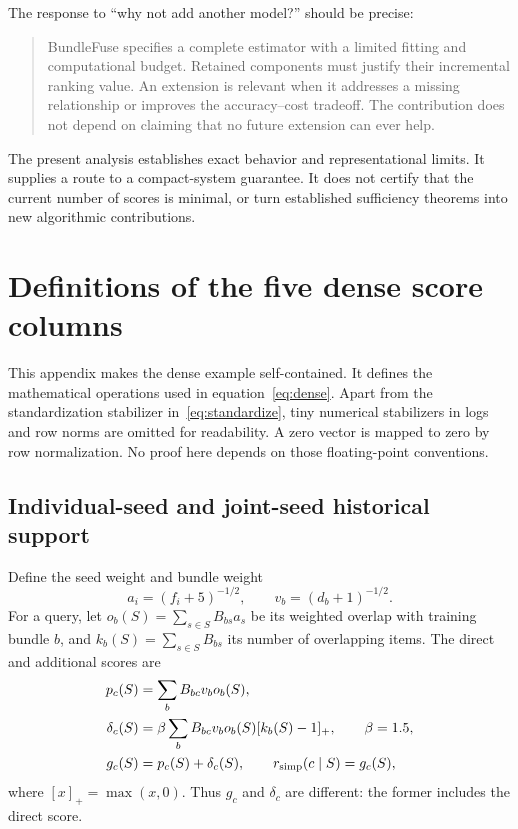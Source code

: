 \documentclass[11pt,a4paper]{article}
\begin{document}
The response to ``why not add another model?'' should be precise:
\begin{quote}
BundleFuse specifies a complete estimator with a limited fitting and
computational budget. Retained components must justify their incremental
ranking value. An extension is relevant when it addresses a missing
relationship or improves the accuracy--cost tradeoff. The contribution does
not depend on claiming that no future extension can ever help.
\end{quote}

The present analysis establishes exact behavior and representational limits.
It supplies a route to a compact-system guarantee. It does not certify that
the current number of scores is minimal, or turn established sufficiency
theorems into new algorithmic contributions.

\appendix
\section{Definitions of the five dense score columns}
\label{app:scores}

This appendix makes the dense example self-contained. It defines the
mathematical operations used in equation~\eqref{eq:dense}. Apart from the
standardization stabilizer in~\eqref{eq:standardize}, tiny numerical
stabilizers in logs and row norms are omitted for readability. A zero vector
is mapped to zero by row normalization. No proof here depends on those
floating-point conventions.

\subsection{Individual-seed and joint-seed historical support}
\label{app:history}

Define the seed weight and bundle weight
\begin{equation}
 a_i=(f_i+5)^{-1/2},\qquad v_b=(d_b+1)^{-1/2}.
\end{equation}
For a query, let $o_b(S)=\sum_{s\in S}B_{bs}a_s$ be its weighted overlap
with training bundle $b$, and $k_b(S)=\sum_{s\in S}B_{bs}$ its number of
overlapping items. The direct and additional scores are
\begin{align}
 p_c(S)&=\sum_b B_{bc}v_b o_b(S),\notag\\
 \delta_c(S)&=\beta\sum_b B_{bc}v_b o_b(S)[k_b(S)-1]_+,
       \qquad \beta=1.5,\notag\\
 g_c(S)&=p_c(S)+\delta_c(S),\qquad r_{\rm simp}(c\mid S)=g_c(S),
 \label{eq:history}
\end{align}
where $[x]_+=\max(x,0)$. Thus $g_c$ and $\delta_c$ are different: the
former includes the direct score.
\end{document}
